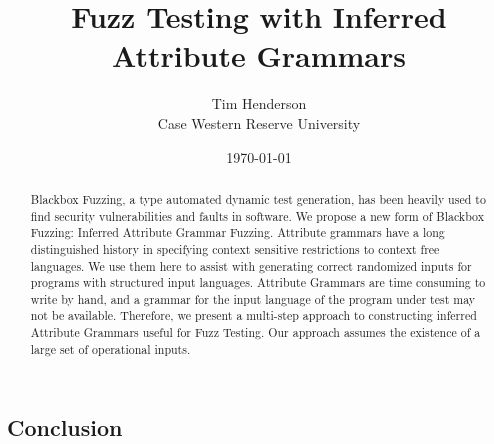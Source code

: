 \title{Fuzz Testing with Inferred Attribute Grammars}
\author{
        Tim Henderson\\
        Case Western Reserve University\\
}
\date{\today}

\maketitle

\begin{abstract}
Blackbox Fuzzing, a type automated dynamic test generation, has been heavily
used to find security vulnerabilities and faults in software. We propose a new
form of Blackbox Fuzzing: Inferred Attribute Grammar Fuzzing. Attribute grammars
have a long distinguished history in specifying context sensitive restrictions to
context free languages. We use them here to assist with generating correct
randomized inputs for programs with structured input languages.  Attribute
Grammars are time consuming to write by hand, and a grammar for the input
language of the program under test may not be available. Therefore, we
present a multi-step approach to constructing inferred Attribute Grammars useful
for Fuzz Testing. Our approach assumes the existence of a large set of
operational inputs.
\end{abstract}
\vspace{.5in}

\begin{multicols}{2}






\section{Conclusion}

\nocite{*}



\end{multicols}

